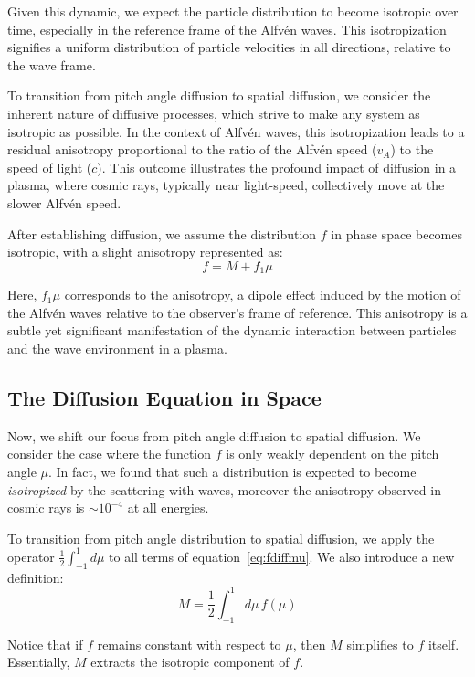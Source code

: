 Given this dynamic, we expect the particle distribution to become isotropic over time, especially in the reference frame of the Alfvén waves. This isotropization signifies a uniform distribution of particle velocities in all directions, relative to the wave frame.

To transition from pitch angle diffusion to spatial diffusion, we consider the inherent nature of diffusive processes, which strive to make any system as isotropic as possible. In the context of Alfvén waves, this isotropization leads to a residual anisotropy proportional to the ratio of the Alfvén speed (\( v_A \)) to the speed of light (\( c \)). This outcome illustrates the profound impact of diffusion in a plasma, where cosmic rays, typically near light-speed, collectively move at the slower Alfvén speed.

After establishing diffusion, we assume the distribution \( f \) in phase space becomes isotropic, with a slight anisotropy represented as:
%
\[
f = M + f_1 \mu
\]

Here, \( f_1 \mu \) corresponds to the anisotropy, a dipole effect induced by the motion of the Alfvén waves relative to the observer's frame of reference. This anisotropy is a subtle yet significant manifestation of the dynamic interaction between particles and the wave environment in a plasma.

\subsection{The Diffusion Equation in Space}

Now, we shift our focus from pitch angle diffusion to spatial diffusion. We consider the case where the function \( f \) is only weakly dependent on the pitch angle \(\mu\). In fact, we found that such a distribution is expected to become \emph{isotropized} by the scattering with waves, moreover the anisotropy observed in cosmic rays is \( \sim 10^{-4} \) at all energies.

To transition from pitch angle distribution to spatial diffusion, we apply the operator \(\frac{1}{2}\int_{-1}^{1} d\mu\) to all terms of equation~\eqref{eq:fdiffmu}. We also introduce a new definition:
%
\begin{equation}\label{eq:Mdef}
M = \frac{1}{2}\int_{-1}^1 d\mu \, f(\mu)
\end{equation}

Notice that if \( f \) remains constant with respect to \( \mu \), then \( M \) simplifies to \( f \) itself. Essentially, \( M \) extracts the isotropic component of \( f \).

